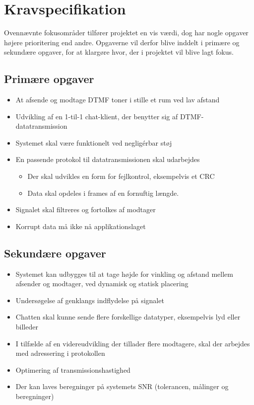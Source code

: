\section{Kravspecifikation}

Ovennævnte fokusområder tilfører projektet en vis værdi, dog har nogle opgaver højere prioritering end andre. Opgaverne vil derfor blive inddelt i primære og sekundære opgaver, for at klargøre hvor, der i projektet vil blive lagt fokus.

\subsection{Primære opgaver}

\begin{itemize}[noitemsep]
  \item At afsende og modtage DTMF toner i stille et rum ved lav afstand
  \item Udvikling af en 1-til-1 chat-klient, der benytter sig af DTMF-datatransmission
  \item Systemet skal være funktionelt ved negligérbar støj
  \item En passende protokol til datatransmissionen skal udarbejdes
  \begin{itemize}[noitemsep]
    \item Der skal udvikles en form for fejlkontrol, eksempelvis et CRC
    \item Data skal opdeles i frames af en fornuftig længde.
  \end{itemize}
  \item Signalet skal filtreres og fortolkes af modtager
  \item Korrupt data må ikke nå applikationslaget
\end{itemize}

\subsection{Sekundære opgaver}

\begin{itemize}[noitemsep]
\item Systemet kan udbygges til at tage højde for vinkling og afstand mellem afsender og modtager, ved dynamisk og statisk placering
\item Undersøgelse af genklangs indflydelse på signalet
\item Chatten skal kunne sende flere forskellige datatyper, eksempelvis lyd eller billeder
\item I tilfælde af en videreudvikling der tillader flere modtagere, skal der arbejdes med adressering i protokollen
\item Optimering af transmissionshastighed
\item Der kan laves beregninger på systemets SNR (tolerancen, målinger og beregninger)
\end{itemize}